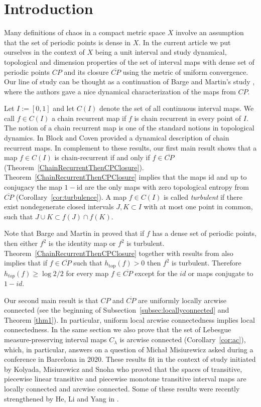 \documentclass[12pt, a4paper]{amsart}
\newcommand{\?}{{\bf ???}}
\def\CP{\overline{CP}}
\begin{document}
\maketitle
\section{Introduction}
Many definitions of chaos in a compact metric space $X$ involve an assumption that the set of periodic points is dense in $X$.  In the current article we put ourselves in the context of $X$ being a unit interval and study dynamical, topological and dimension properties  of the set of interval maps with dense set of periodic points $CP$ and its closure $\CP$ using the metric of uniform convergence. Our line of study can be thought as a continuation of Barge and Martin's study \cite{BM}, where the authors gave a nice dynamical characterization of the maps from $CP$. 

Let $I:=[0,1]$ and let $C(I)$ denote the set of all continuous interval maps. We call $f\in C(I)$ a chain recurrent map if $f$ is chain recurrent in every point of $I$. The notion of a chain recurrent map is one of the standard notions in topological dynamics. In \cite{BC} Block and Coven provided a dynamical description of chain recurrent maps. In complement to these results, 
our first main result shows that a map $f \in C(I)$ is chain-recurrent if and only if $f\in \overline{CP}$ (Theorem~\ref{ChainRecurrentThenCPClosure}). 
Theorem~\ref{ChainRecurrentThenCPClosure} implies that the maps $\mathrm{id}$ and up to conjugacy the map $1-\mathrm{id}$  are the only maps with zero topological entropy from $\overline{CP}$ (Corollary~\ref{cor:turbulence}). A map $f\in C(I)$ is called \textit{turbulent} if there exist nondegenerate closed intervals $J, K \subset I$ with at most one point in common, such that $J\cup K\subset f(J)\cap f(K)$.

 Note that Barge and Martin in \cite{BM} proved that if $f$ has a dense set of periodic points, then either $f^2$ is the identity map or $f^2$ is turbulent.
Theorem~\ref{ChainRecurrentThenCPClosure} together with results from \cite{BC} also implies that if $f\in \overline{CP}$ such that $h_{\mathrm{top}}(f)>0$ then $f^2$ is turbulent. Therefore
$h_{top}(f)\geq\log{2}/2$ for every map
$f \in \CP$ except for the $id$ or maps conjugate to $1-id$.


Our second main result is that 
$CP$ and $\overline{CP}$ are uniformly locally arcwise connected (see the beginning of Subsection~\ref{subsec:locallyconnected} and Theorem \ref{thm1}). In particular, uniform local arcwise connectedness implies local connectedness. 
In the same section we also prove that the set of Lebesgue measure-preserving interval maps $C_{\lambda}$ is  arcwise connected (Corollary~\ref{cor:ac}), 
which, in particular, answers on a question of Micha\l\/  Misiurewicz asked during a conference in Barcelona in 2020. These results fit in the context of study initiated by Kolyada, Misiurewicz and Snoha \cite{KMS} who proved that the spaces of transitive, piecewise linear transitive and piecewise monotone transitive interval maps are locally connected and arcwise connected.  Some of these results were recently strengthened by He, Li and Yang in \cite{HLY}.
\end{document}
